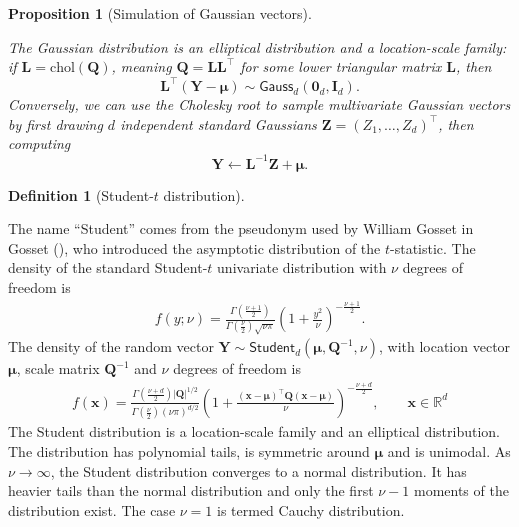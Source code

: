 \documentclass[
  11pt,
  letterpaper,
]{scrbook}
\theoremstyle{definition}
\theoremstyle{definition}
\theoremstyle{definition}
\newtheorem{definition}{Definition}[chapter]
\theoremstyle{plain}
\newtheorem{proposition}{Proposition}[chapter]
\theoremstyle{plain}
\theoremstyle{remark}
\begin{document}
\begin{proposition}[Simulation of Gaussian
vectors]\protect\hypertarget{prp-gaussian-dist-property}{}\label{prp-gaussian-dist-property}

The Gaussian distribution is an elliptical distribution and a
location-scale family: if
\(\boldsymbol{L} = \mathrm{chol}(\boldsymbol{Q})\), meaning
\(\boldsymbol{Q}=\boldsymbol{LL}^\top\) for some lower triangular matrix
\(\boldsymbol{L}\), then
\[\boldsymbol{L}^\top(\boldsymbol{Y}-\boldsymbol{\mu}) \sim \mathsf{Gauss}_d(\boldsymbol{0}_d, \mathbf{I}_d).\]
Conversely, we can use the Cholesky root to sample multivariate Gaussian
vectors by first drawing \(d\) independent standard Gaussians
\(\boldsymbol{Z}=(Z_1, \ldots, Z_d)^\top\), then computing
\[\boldsymbol{Y} \gets \boldsymbol{L}^{-1}\boldsymbol{Z}+ \boldsymbol{\mu}.\]

\end{proposition}

\begin{definition}[Student-\(t\)
distribution]\protect\hypertarget{def-student-dist}{}\label{def-student-dist}

The name ``Student'' comes from the pseudonym used by William Gosset in
Gosset (), who introduced the
asymptotic distribution of the \(t\)-statistic. The density of the
standard Student-\(t\) univariate distribution with \(\nu\) degrees of
freedom is \begin{align*}
f(y; \nu) = \frac{\Gamma \left( \frac{\nu+1}{2}\right)}{\Gamma\left(\frac{\nu}{2}\right)
\sqrt{\nu\pi}}\left(1+\frac{y^{2}}{\nu}\right)^{-\frac{\nu+1}{2}}.
\end{align*} The density of the random vector
\(\boldsymbol{Y} \sim \mathsf{Student}_d(\boldsymbol{\mu}, \boldsymbol{Q}^{-1}, \nu)\),
with location vector \(\boldsymbol{\mu}\), scale matrix
\(\boldsymbol{Q}^{-1}\) and \(\nu\) degrees of freedom is \begin{align*}
f(\boldsymbol{x}) = \frac{\Gamma \left( \frac{\nu+d}{2}\right)|\boldsymbol{Q}|^{1/2}}{\Gamma\left(\frac{\nu}{2}\right)
(\nu\pi)^{d/2}}\left(1+\frac{(\boldsymbol{x}-\boldsymbol{\mu})^\top\boldsymbol{Q}(\boldsymbol{x}-\boldsymbol{\mu})}{\nu} \right)^{-\frac{\nu+d}{2}}, \qquad \boldsymbol{x} \in \mathbb{R}^d
\end{align*} The Student distribution is a location-scale family and an
elliptical distribution. The distribution has polynomial tails, is
symmetric around \(\boldsymbol{\mu}\) and is unimodal. As
\(\nu \to \infty\), the Student distribution converges to a normal
distribution. It has heavier tails than the normal distribution and only
the first \(\nu-1\) moments of the distribution exist. The case
\(\nu=1\) is termed Cauchy distribution.

\end{definition}
\end{document}
